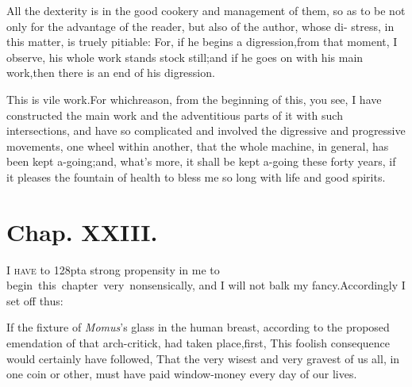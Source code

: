\documentclass{article}
\begin{document}
All the dexterity is in the good cookery and management of them,
so as to\break 
be not only for the advantage of the\break
reader, but also of the author, whose di-\break 
stress, in this matter, is truely pitiable:\pb
For, if he begins a digression,\tsk  from that moment, I observe, his whole work
stands stock still;\tsk  and if he goes on with his main work,\tsk  then there is an
end of his digression.

\tsh  This is vile work.\tsk  For which\break reason, from
the beginning of this, you see, I have constructed the main work
and the adventitious parts of it with such intersections, and have
so complicated and involved the digressive and progressive
movements, one wheel within another, that the whole machine, in
general, has been kept a-going;\tsk  and, what’s more, it
shall be kept a-going these forty years, if it pleases the fountain
of health to bless me so long with life and good spirits.

\newpage
\section{Chap. XXIII.}

\lettrine{I}{ have} \hbox to 128pt{a strong propensity in me to}\break
\hbox{begin this chapter very nonsensically,} and I will not balk my
fancy.\tsk  Accord\-ingly I set off thus:

If the fixture of \textit{Momus}’s glass in the human
breast, according to the proposed emendation of that arch-critick,
had taken place,\tsh  first, This foolish
consequence would certainly have followed,\tsh\break
That the very
wisest and very gravest of us all, in one coin or other, must have
paid window-money every day of our lives.
\end{document}
